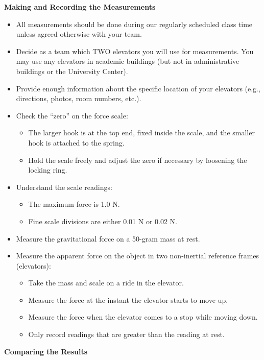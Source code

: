 \documentclass[12pt]{article}
\begin{document}
{\bf{\noindent Making and Recording the Measurements}}
\begin{itemize}
    \item All measurements should be done during our regularly scheduled class
    time unless agreed otherwise with your team.
    \item Decide as a team which TWO elevators you will use for measurements.
    You may use any elevators in academic buildings (but not in administrative
    buildings or the University Center).
    \item Provide enough information about the specific location of your
    elevators (e.g., directions, photos, room numbers, etc.).
    \item Check the “zero” on the force scale:
    \begin{itemize}
        \item The larger hook is at the top end, fixed inside the scale, and the
        smaller hook is attached to the spring.
        \item Hold the scale freely and adjust the zero if necessary by
        loosening the locking ring.
    \end{itemize}
    \item Understand the scale readings:
    \begin{itemize}
        \item The maximum force is 1.0 N.
        \item Fine scale divisions are either 0.01 N or 0.02 N.
    \end{itemize}
    \item Measure the gravitational force on a 50-gram mass at rest.
    \item Measure the apparent force on the object in two non-inertial reference
    frames (elevators):
    \begin{itemize}
        \item Take the mass and scale on a ride in the elevator.
        \item Measure the force at the instant the elevator starts to move up.
        \item Measure the force when the elevator comes to a stop while moving
        down.
        \item Only record readings that are greater than the reading at rest.
    \end{itemize}
\end{itemize}


{\bf{\noindent Comparing the Results}}
\end{document}
